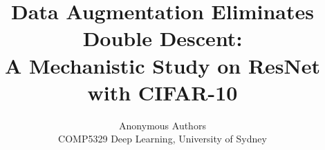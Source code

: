 \documentclass[10pt,twocolumn,letterpaper]{article}
\begin{document}
\title{Data Augmentation Eliminates Double Descent:\\A Mechanistic Study on ResNet with CIFAR-10}

\author{Anonymous Authors\\
COMP5329 Deep Learning, University of Sydney\\
}

\maketitle










{\small


}
\end{document}
